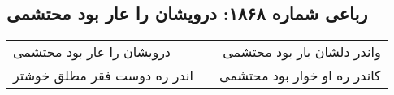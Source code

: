 \begin{center}
\section*{رباعی شماره ۱۸۶۸: درویشان را عار بود محتشمی}
\label{sec:1868}
\begin{longtable}{l p{0.5cm} r}
درویشان را عار بود محتشمی
&&
واندر دلشان بار بود محتشمی
\\
اندر ره دوست فقر مطلق خوشتر
&&
کاندر ره او خوار بود محتشمی
\\
\end{longtable}
\end{center}
